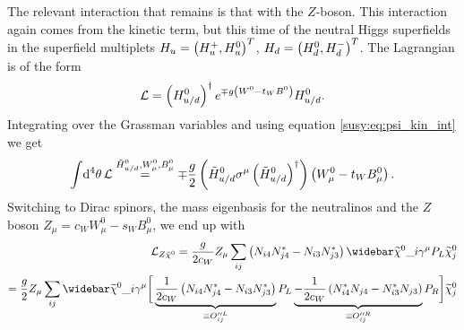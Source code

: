 \documentclass[../main.tex]{subfiles}
\begin{document}
The relevant interaction that remains is that with the \(Z\)-boson. This
interaction again comes from the kinetic term, but this time of the neutral
Higgs superfields in the superfield multiplets \(H_u = \left(H_u^+,
    H_u^0\right)^T\), \(H_d = \left(H_d^0, H_d^-\right)^T\). The Lagrangian is of the form
\begin{equation}
    \mathcal{L} = \left(H_{u/d}^0\right)^\dagger e^{\mp g\left(W^0 - t_W B^0\right)} H_{u/d}^0.
\end{equation}
Integrating over the Grassman variables and using equation \cref{susy:eq:psi_kin_int} we get
\begin{equation}
    \int \!\mathrm{d}^4\theta\, \mathcal{L} \stackrel{\tilde{H}_{u/d}^0, W^0_\mu, B^0_\mu}{=} \mp \frac{g}{2} \left(\tilde{H}_{u/d}^0 \sigma^\mu \left(\tilde{H}_{u/d}^0\right)^\dagger\right)\left(W^0_\mu - t_W B_\mu^0\right).
\end{equation}
Switching to Dirac spinors, the mass eigenbasis for the neutralinos and the \(Z\) boson \(Z_\mu = c_W W^0_\mu - s_W B^0_\mu\), we end up with
\begin{align}
    \nonumber
    \L_{Z \tilde{\chi}^0} = \frac{g}{2c_W} Z_\mu \sum_{ij}\pclosed{N_{i4}N_{j4}^\ast - N_{i3}N_{j3}^\ast} \barnino[i] \gamma^\mu P_L \nino[j] \\
    = \frac{g}{2} Z_\mu \sum_{ij}\barnino[i] \gamma^\mu \bigg[ \underbrace{\frac{1}{2c_W}\pclosed{N_{i4}N_{j4}^\ast - N_{i3}N_{j3}^\ast}}_{\equiv O^{\prime\prime L}_{ij}} P_L \underbrace{-\frac{1}{2c_W}\pclosed{N_{i4}^\ast N_{j4} - N_{i3}^\ast N_{j3}}}_{\equiv O^{\prime\prime R}_{ij}} P_R \bigg] \nino[j]
\end{align}
\end{document}
